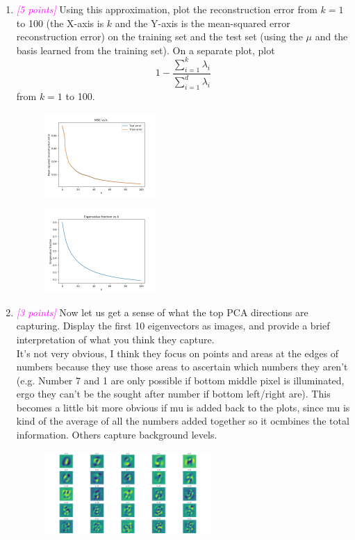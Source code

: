 \documentclass{article}
\newcommand{\1}{\mathbf{1}}
\newcommand{\points}[1]{\small\textcolor{magenta}{\emph{[#1 points]}} \normalsize}
\begin{document}
\begin{enumerate}
    \newpage
    \item \points{5} Using this approximation, plot the reconstruction error from $k=1$ to 100 (the X-axis is $k$ and the Y-axis is the mean-squared error reconstruction error) on the training set and the test set (using the $\mu$ and the basis learned from the training set). On a separate plot, plot 
    $$1 - \frac{\sum^k_{i=1}\lambda_i}{\sum^d_{i=1}\lambda_i}$$
    from $k=1$ to 100. \\
    \begin{figure}[h!]
    \centering 
    \includegraphics[width=0.4\textwidth]{HW3/HW3_plots/A6a_MSE.png}
    \end{figure}
    \begin{figure}[h!]
    \centering 
    \includegraphics[width=0.4\textwidth]{HW3/HW3_plots/A6a_EigenFrac.png}
    \end{figure}
    
    \newpage
    \item \points{3} Now let us get a sense of what the top PCA directions are capturing. Display the first  10 eigenvectors as images, and provide a brief interpretation of what you think they capture. \\
    It's not very obvious, I think they focus on points and areas at the edges of numbers because they use those areas to ascertain which numbers they aren't (e.g. Number 7 and 1 are only possible if bottom middle pixel is illuminated, ergo they can't be the sought after number if bottom left/right are). This becomes a little bit more obvious if mu is added back to the plots, since mu is kind of the average of all the numbers added together so it ocmbines the total information. Others capture background levels.\\
    \begin{figure}[h!]
    \centering 
    \includegraphics[width=0.6\textwidth]{HW3/HW3_plots/A6b_Eigenvectors.png}
    \end{figure}
    

\end{enumerate}
\end{document}
